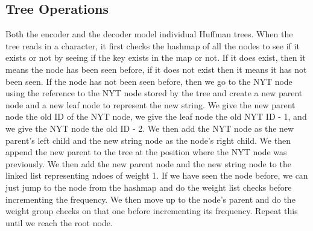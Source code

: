 \documentclass[12pt, letterpaper]{article}
\begin{document}
\subsection{Tree Operations}
Both the encoder and the decoder model individual Huffman trees. When the tree reads in a character, it first checks the hashmap of all the nodes to see if it exists or not by seeing if the key exists in the map or not. If it does exist, then it means the node has been seen before, if it does not exist then it means it has not been seen. 
\newline \newline
If the node has not been seen before, then we go to the NYT node using the reference to the NYT node stored by the tree and create a new parent node and a new leaf node to represent the new string. We give the new parent node the old ID of the NYT node, we give the leaf node the old NYT ID - 1, and we give the NYT node the old ID - 2. We then add the NYT node as the new parent's left child and the new string node as the node's right child. We then append the new parent to the tree at the position where the NYT node was previously. We then add the new parent node and the new string node to the linked list representing ndoes of weight 1. If we have seen the node before, we can just jump to the node from the hashmap and do the weight list checks before incrementing the frequency. We then move up to the node's parent and do the weight group checks on that one before incrementing its frequency. Repeat this until we reach the root node.
\end{document}
